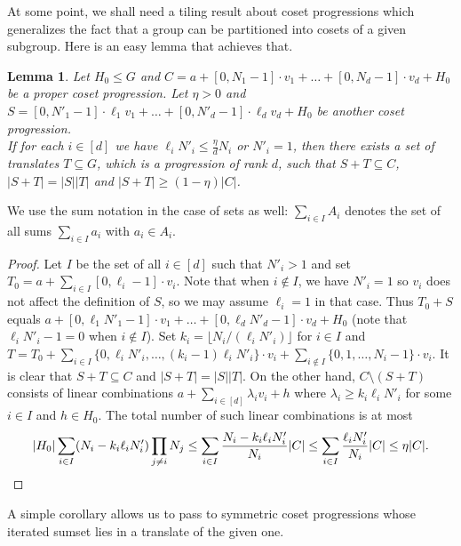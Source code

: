 \documentclass[a4paper,11pt]{article}
\numberwithin{theorem}{section}
\newtheorem{lemma}[theorem]{Lemma}
\theoremstyle{definition}
\begin{document}
At some point, we shall need a tiling result about coset progressions which generalizes the fact that a group can be partitioned into cosets of a given subgroup. Here is an easy lemma that achieves that.

\begin{lemma}\label{tilingLemma}
    Let $H_0 \leq G$ and $C = a + [0, N_1 -1 ] \cdot v_1 + \dots + [0, N_d - 1] \cdot v_d + H_0$ be a proper coset progression. Let $\eta > 0$ and $S = [0, N'_1 - 1] \cdot \ell_1 v_1 + \dots + [0, N'_d - 1] \cdot \ell_d v_d + H_0$ be another coset progression.\\
    If for each $i \in [d]$ we have $\ell_i N'_i \leq \frac{\eta}{d}N_i$ or $N'_i = 1$, then there exists a set of translates $T \subseteq G$, which is a progression of rank $d$, such that $S + T \subseteq C$, $|S+ T| = | S||T|$ and $|S + T| \geq (1 - \eta) |C|$.
\end{lemma}

We use the sum notation in the case of sets as well: $\sum_{i \in I} A_i$ denotes the set of all sums $\sum_{i \in I} a_i$ with $a_i \in A_i$.

\begin{proof}
    Let $I$ be the set of all $i \in [d]$ such that $N'_i > 1$ and set $T_0 = a + \sum_{i \in I} [0, \ell_i - 1] \cdot v_i$. Note that when $i \notin I$, we have $N'_i = 1$ so $v_i$ does not affect the definition of $S$, so we may assume $\ell_i = 1$ in that case. Thus $T_0 + S$ equals $a + [0, \ell_1 N'_1 -1] \cdot v_1 + \dots + [0, \ell_d N'_d -1] \cdot v_d + H_0$ (note that $ \ell_i N'_i -1 = 0$ when $i \notin I$). Set $k_i = \lfloor N_i / (\ell_i N'_i)\rfloor$ for $i \in I$ and $T = T_0 + \sum_{i \in I} \{0, \ell_i N'_i, \dots, (k_i - 1) \ell_i N'_i\} \cdot v_i + \sum_{i \notin I} \{0, 1, \dots, N_i - 1\}\cdot v_i$. It is clear that $S + T \subseteq C$ and $|S+ T| = | S||T|$. On the other hand, $C \setminus (S + T)$ consists of linear combinations $a + \sum_{i \in [d]} \lambda_i v_i + h$ where $\lambda_i \geq k_i \ell_i N'_i$ for some $i \in I$ and $h \in H_0$. The total number of such linear combinations is at most
    \[|H_0| \sum_{i \in I} (N_i -k_i \ell_i N'_i ) \prod_{j \not= i} N_j \leq \sum_{i \in I} \frac{N_i -k_i \ell_i N'_i }{N_i} |C| \leq \sum_{i \in I} \frac{\ell_i N'_i }{N_i} |C| \leq \eta |C|.\qedhere\]
\end{proof}

A simple corollary allows us to pass to symmetric coset progressions whose iterated sumset lies in a translate of the given one.
\end{document}
